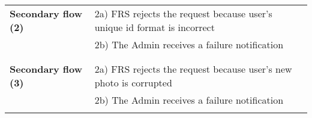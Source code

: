 \documentclass[a4paper,11pt]{article}
\begin{document}
\begin{tabular}{|p{4cm}|p{10cm}|}
	\\ \hline \rowcolor{Gray} & \\ \hline 
	
	\textbf{Secondary flow (2)} & 
	2a) FRS rejects the request because user's unique id format is incorrect \\&
	2b) The Admin receives a failure notification \\&
	
	
	\\ \hline \rowcolor{Gray} & \\ \hline 
	
	\textbf{Secondary flow (3)} & 
	2a) FRS rejects the request because user's new photo is corrupted\\&
	2b) The Admin receives a failure notification \\&
	\\ \hline  
\end{tabular}
\end{document}
